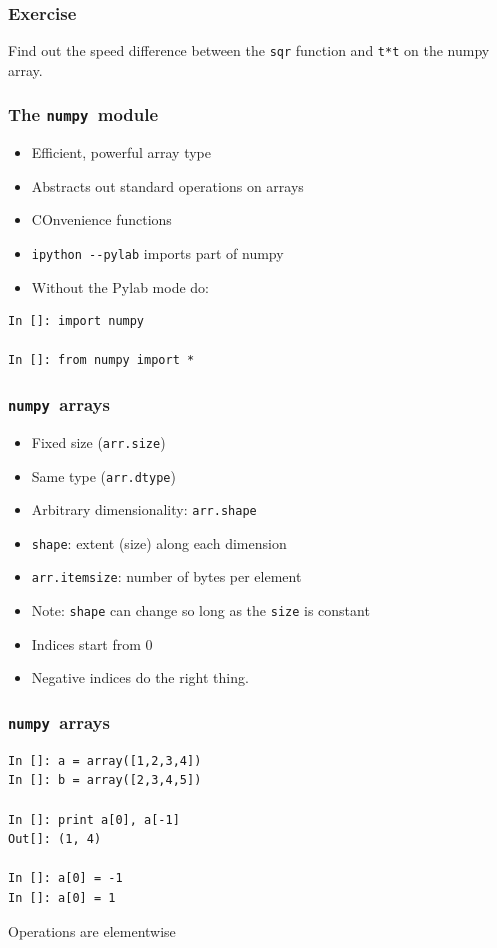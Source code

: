 \documentclass[14pt,compress]{beamer}
\newcommand{\typ}[1]{\lstinline{#1}}
\begin{document}
\begin{frame}[fragile]
\frametitle{Exercise}
\begin{center}
    Find out the speed difference between the \typ{sqr} function and
    \typ{t*t} on the numpy array.
\end{center}

\end{frame}

\newcommand{\num}{\texttt{numpy}}


\begin{frame}[fragile]
  \frametitle{The \num\ module}
    \begin{itemize}
    \item Efficient, powerful array type
    \item Abstracts out standard operations on arrays
    \item COnvenience functions
    \item \typ{ipython --pylab} imports part of numpy
    \item Without the Pylab mode do:
    \end{itemize}
    \begin{lstlisting}
In []: import numpy

In []: from numpy import *
    \end{lstlisting}
\end{frame}

\begin{frame}
  \frametitle{\num\ arrays}
  \begin{itemize}
  \item Fixed size (\typ{arr.size})
  \item Same type (\typ{arr.dtype})
  \item Arbitrary dimensionality: \typ{arr.shape}
  \item \typ{shape}: extent (size) along each dimension
  \item \typ{arr.itemsize}: number of bytes per element
  \item \alert{Note:} \typ{shape} can change so long as the \typ{size}
      is constant
  \item Indices start from 0
  \item Negative indices do the right thing.
  \end{itemize}
\end{frame}

\begin{frame}[fragile]
  \frametitle{\num\ arrays}
\begin{lstlisting}
In []: a = array([1,2,3,4])
In []: b = array([2,3,4,5])

In []: print a[0], a[-1]
Out[]: (1, 4)

In []: a[0] = -1
In []: a[0] = 1
\end{lstlisting}
Operations are elementwise
\end{frame}
\end{document}
